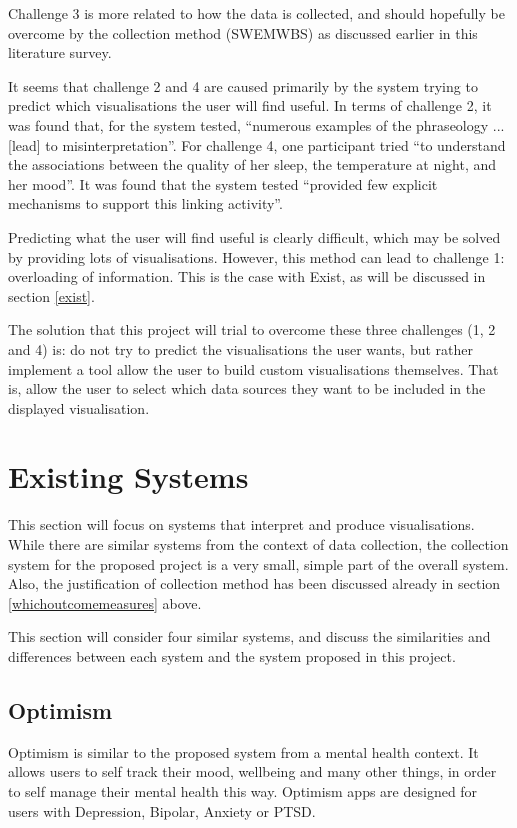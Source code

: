 \documentclass[11pt,openright,a4paper]{report}
\begin{document}
Challenge 3 is more related to how the data is collected, and should hopefully be overcome by the collection method (SWEMWBS) as discussed earlier in this literature survey.

It seems that challenge 2 and 4 are caused primarily by the system trying to predict which visualisations the user will find useful. In terms of challenge 2, it was found that, for the system tested, \enquote{numerous examples of the phraseology ... [lead] to misinterpretation}. For challenge 4, one participant tried \enquote{to understand the associations between the quality of her sleep, the temperature at night, and her mood}. It was found that the system tested \enquote{provided few explicit mechanisms to support this linking activity}.

Predicting what the user will find useful is clearly difficult, which may be solved by providing lots of visualisations. However, this method can lead to challenge 1: overloading of information. This is the case with Exist, as will be discussed in section \ref{exist}.

The solution that this project will trial to overcome these three challenges (1, 2 and 4) is: do not try to predict the visualisations the user wants, but rather implement a tool allow the user to build custom visualisations themselves. That is, allow the user to select which data sources they want to be included in the displayed visualisation.

\section{Existing Systems} \label{existingsystems}
This section will focus on systems that interpret and produce visualisations. While there are similar systems from the context of data collection, the collection system for the proposed project is a very small, simple part of the overall system. Also, the justification of collection method has been discussed already in section \ref{whichoutcomemeasures} above.

This section will consider four similar systems, and discuss the similarities and differences between each system and the system proposed in this project.

\subsection{Optimism}
Optimism \parencite{optimism} is similar to the proposed system from a mental health context. It allows users to self track their mood, wellbeing and many other things, in order to self manage their mental health this way. Optimism apps are designed for users with Depression, Bipolar, Anxiety or PTSD.
\end{document}
